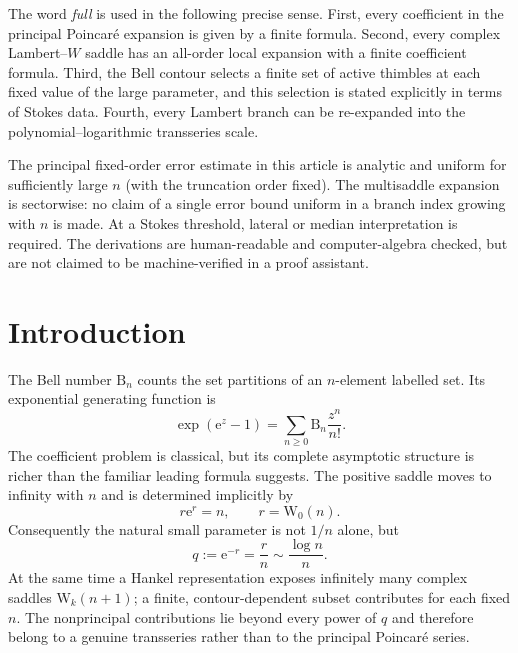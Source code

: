 \documentclass[11pt,a4paper]{article}
\theoremstyle{definition}
\newcommand{\Bell}{\mathrm B}
\newcommand{\W}{\mathrm W}
\newcommand{\ee}{\mathrm e}
\begin{document}
\begin{scopebox}
The word \emph{full} is used in the following precise sense.  First, every
coefficient in the principal Poincar\'e expansion is given by a finite formula.
Second, every complex Lambert--$W$ saddle has an all-order local expansion with
a finite coefficient formula.  Third, the Bell contour selects a finite set of
active thimbles at each fixed value of the large parameter, and this selection
is stated explicitly in terms of Stokes data.  Fourth, every Lambert branch can
be re-expanded into the polynomial--logarithmic transseries scale.

The principal fixed-order error estimate in this article is analytic and
uniform for sufficiently large $n$ (with the truncation order fixed).  The
multisaddle expansion is sectorwise: no claim of a single error bound uniform
in a branch index growing with $n$ is made.  At a Stokes threshold, lateral or
median interpretation is required.  The derivations are human-readable and
computer-algebra checked, but are not claimed to be machine-verified in a proof
assistant.
\end{scopebox}

\tableofcontents
\bigskip

\section{Introduction}

The Bell number $\Bell_n$ counts the set partitions of an $n$-element labelled
set.  Its exponential generating function is
\begin{equation}\label{eq:egf}
 \exp(\ee^z-1)=\sum_{n\ge0}\Bell_n\frac{z^n}{n!}.
\end{equation}
The coefficient problem is classical, but its complete asymptotic structure is
richer than the familiar leading formula suggests.  The positive saddle moves
to infinity with $n$ and is determined implicitly by
\[
 r\ee^r=n,
 \qquad r=\W_0(n).
\]
Consequently the natural small parameter is not $1/n$ alone, but
\[
 q:=\ee^{-r}=\frac rn\sim\frac{\log n}{n}.
\]
At the same time a Hankel representation exposes infinitely many complex
saddles $\W_k(n+1)$; a finite, contour-dependent subset contributes for each
fixed $n$.  The nonprincipal contributions lie beyond every power of $q$ and
therefore belong to a genuine transseries rather than to the principal
Poincar\'e series.
\end{document}
